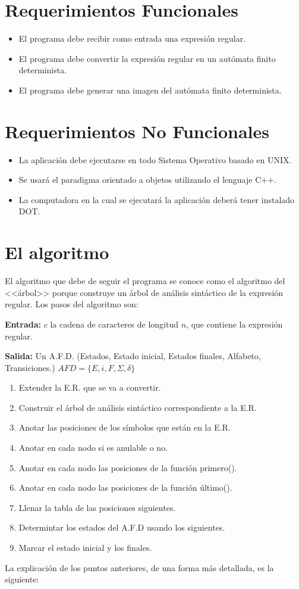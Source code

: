 \documentclass{report}
\begin{document}
\section{Requerimientos Funcionales}

\begin{itemize}
  \item El programa debe recibir como entrada una expresión regular.
  \item El programa debe convertir la expresión regular en un autómata finito determinista.
  \item El programa debe generar una imagen del autómata finito determinista.
\end{itemize}


\section{Requerimientos No Funcionales}
\begin{itemize}
	\item La aplicación debe ejecutarse en todo Sistema Operativo basado en UNIX.
	\item Se usará el paradigma orientado a objetos utilizando el lenguaje C++.
	\item La computadora en la cual se ejecutará la aplicación deberá tener instalado DOT.
\end{itemize}


\section{El algoritmo}
El algoritmo que debe de seguir el programa se conoce como el algoritmo del <<árbol>> porque 
construye un árbol de análisis sintáctico de la expresión regular. Los pasos del algoritmo 
son:

{\bf Entrada:} $c$ la cadena de caracteres de longitud $n$, que contiene la expresión regular.

{\bf Salida:} Un A.F.D. (Estados, Estado inicial, Estados finales, Alfabeto, Transiciones.) $AFD=\{E,i,F,\Sigma,\delta\}$
\begin{enumerate}
	\item Extender la E.R. que se va a convertir.
	\item Construir el árbol de análisis sintáctico correspondiente a la E.R.
	\item Anotar las posiciones de los símbolos que están en la E.R.
	\item Anotar en cada nodo si es anulable o no.
	\item Anotar en cada nodo las posiciones de la función primero().
	\item Anotar en cada nodo las posiciones de la función último().
	\item Llenar la tabla de las posiciones siguientes.
	\item Determintar los estados del A.F.D usando los siguientes.
	\item Marcar el estado inicial y los finales.
\end{enumerate}
La explicación de los puntos anteriores, de una forma más detallada, es la siguiente:
\end{document}

